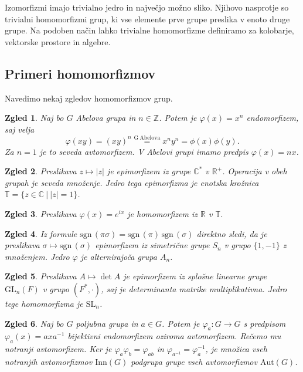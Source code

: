 \documentclass[10pt, a4paper]{article}
\newtheorem{zgled}{Zgled}[section]
\newcommand{\Z}{\mathbb {Z}}
\newcommand{\R}{\mathbb {R}}
\newcommand{\C}{\mathbb {C}}
\newcommand{\sgn}{\mathrm{sgn}\,}
\begin{document}
Izomorfizmi imajo trivialno jedro in največjo možno sliko.
Njihovo nasprotje so trivialni homomorfizmi grup, ki vse elemente prve grupe preslika v enoto druge grupe.
Na podoben način lahko trivialne homomorfizme definiramo za kolobarje, vektorske prostore in algebre.

\subsection{Primeri homomorfizmov}

Navedimo nekaj zgledov homomorfizmov grup.

\begin{zgled}
  Naj bo $G$ Abelova grupa in $n \in \Z$. Potem je $\varphi (x) = x^n$ endomorfizem, saj velja 
  $$\varphi(xy) = (xy)^n \stackrel{\mathrm{G\ Abelova}}{=} x^n y^n = \phi(x) \phi(y).$$
  Za $n = 1$ je to seveda avtomorfizem. V Abelovi grupi imamo predpis $\varphi(x) = n x$.
\end{zgled}

\begin{zgled}
  Preslikava $z \mapsto |z|$ je epimorfizem iz grupe $\C^*$ v $\R^+$. Operacija v obeh grupah je seveda množenje.
  Jedro tega epimorfizma je enotska krožnica $\mathbb{T} = \{z \in \C\ |\ |z| = 1\}$.
\end{zgled}

\begin{zgled}
  Preslikava $\varphi(x) = e^{ix}$ je homomorfizem iz $\R$ v $\mathbb{T}$.
\end{zgled}

\begin{zgled}
  Iz formule $\sgn (\pi \sigma) = \sgn (\pi)\, \sgn (\sigma)$ direktno sledi, da je preslikava 
  $\sigma \mapsto \sgn (\sigma)$ epimorfizem iz simetrične grupe $S_n$ v grupo $\{1, -1\}$ z množenjem.
  Jedro $\varphi$ je alternirajoča grupa $A_n$.
\end{zgled}

\begin{zgled}
  Preslikava $A \mapsto \det A$ je epimorfizem iz splošne linearne grupe $\mathrm{GL}_n (F)$ v grupo $(F^*, \cdot)$,
  saj je determinanta matrike multiplikativna. Jedro tege homomorfizma je $\mathrm{SL}_n$.
\end{zgled}

\begin{zgled}
  Naj bo $G$ poljubna grupa in $a \in G$.
  Potem je $\varphi_a: G \to G$ s predpisom $\varphi_a (x) = a x a^{-1}$ bijektivni endomorfizem oziroma avtomorfizem.
  Rečemo mu notranji avtomorfizem. Ker je $\varphi_a \varphi_b = \varphi_{ab}$ in $\varphi_{a^{-1}} = \varphi_a^{-1}$, je množica vseh notranjih avtomorfizmov $\mathrm{Inn}(G)$ 
  podgrupa grupe vseh avtomorfizmov $\mathrm{Aut}(G)$.
\end{zgled}
\end{document}
